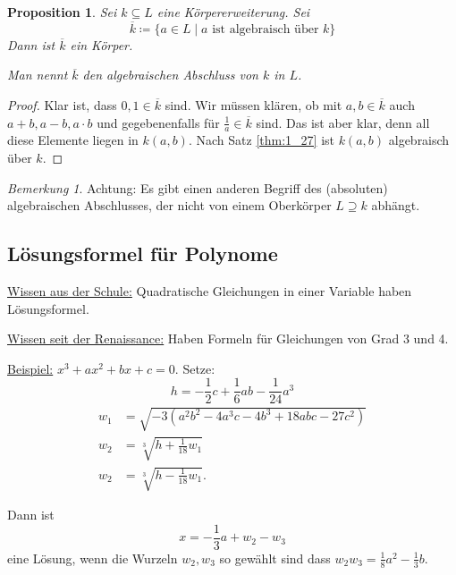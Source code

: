 \documentclass[a4paper,12pt,numbers=noenddot,parskip=full]{scrartcl}
\newcommand{\heading}{\underline}
\theoremstyle{dotless}
\newtheorem{proposition}[theorem]{Proposition}
\theoremstyle{remark}
\newtheorem*{remark}{Bemerkung}
\begin{document}
	\begin{proposition}
		Sei $k \subseteq L$ eine Körpererweiterung. Sei
		\begin{equation*}
			\overline{k} \coloneqq \{ a \in L \mid a \text{ ist algebraisch über } k \}
		\end{equation*}
		Dann ist $\overline{k}$ ein Körper.
		
		Man nennt $\overline{k}$ den algebraischen Abschluss von $k$ in $L$.
	\end{proposition}

	\begin{proof}
		Klar ist, dass $0,1 \in \overline{k}$ sind. Wir müssen klären, ob mit $a,b \in \overline{k}$ auch $a+b, a-b, a \cdot b$ und gegebenenfalls für $\frac{1}{a} \in \overline{k}$ sind. Das ist aber klar, denn all diese Elemente liegen in $k(a,b)$. Nach Satz \ref{thm:1_27} ist $k(a,b)$ algebraisch über $k$.
	\end{proof}

	\begin{remark}
		Achtung: Es gibt einen anderen Begriff des (absoluten) algebraischen Abschlusses, der nicht von einem Oberkörper $L \supseteq k$ abhängt.
	\end{remark}

	\subsection{Lösungsformel für Polynome}
	
	\heading{Wissen aus der Schule:} Quadratische Gleichungen in einer Variable haben Lösungsformel.
	
	\heading{Wissen seit der Renaissance:} Haben Formeln für Gleichungen von Grad 3 und 4.
	
	\heading{Beispiel:} $x^3 + a x^2 + bx + c = 0$. Setze:
	\begin{equation*}
		h = - \frac12 c + \frac16 a b - \frac{1}{24} a^3
	\end{equation*}
	\begin{align*}
		w_1 &= \sqrt{-3 (a^2 b^2 - 4 a^3c - 4b^3 + 18abc - 27c^2)} \\
		w_2 &= \sqrt[3]{h + \frac{1}{18} w_1} \\
		w_2 &= \sqrt[3]{h - \frac{1}{18} w_1}.
	\end{align*}
	
	Dann ist
	\begin{equation*}
		x = - \frac13 a + w_2 - w_3
	\end{equation*}
	eine Lösung, wenn die Wurzeln $w_2, w_3$ so gewählt sind dass $w_2 w_3 = \frac18 a^2 - \frac13 b$.
	
\end{document}
